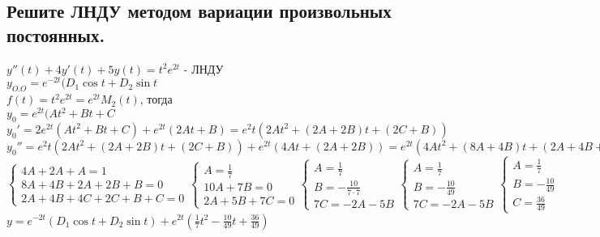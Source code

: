 \documentclass{article}
\begin{document}
    \subsection{Решите ЛНДУ методом вариации произвольных постоянных.}
    $y''(t) + 4y'(t) + 5y(t) = t^2e^{2t}$ - ЛНДУ\\
    $y_{O.O} = e^{-2t}(D_1 \cos t + D_2 \sin t$\\
    $f(t) = t^2 e^{2t} = e^{2t} M_2 (t)$, тогда\\
    $y_0 = e^{2t} (A t^2 + B t + C$\\
    $y_0' = 2e^{2t}(A t^2 + B t + C) + e^{2t}(2A t + B) = 
    e^2t(2A t^2 + (2A + 2B)t + (2C + B))$\\
    $y_0'' = e^2t(2A t^2 + (2A + 2B)t + (2C + B)) + e^{2t}(4A t + (2A + 2B)) = e^{2t}(4A t^2 + (8A + 4B)t + (2A + 4B + 4C))$\\
    \begin{equation*}
        \begin{cases}
            4A + 2A + A = 1\\
            8A + 4B + 2A + 2B + B = 0\\
            2A + 4B + 4C + 2C + B + C = 0
        \end{cases}
        \begin{cases}
            A = \frac{1}{7}\\
            10A + 7B = 0\\
            2A + 5B + 7C = 0
        \end{cases}
        \begin{cases}
            A = \frac{1}{7}\\
            B = - \frac{10}{7 \cdot 7} \\
            7C = -2A -5B
        \end{cases}
        \begin{cases}
            A = \frac{1}{7}\\
            B = - \frac{10}{49} \\
            7C = -2A -5B
        \end{cases}
        \begin{cases}
            A = \frac{1}{7}\\
            B = - \frac{10}{49} \\
            C = \frac{36}{49}
        \end{cases}
    \end{equation*}
    $y=e^{-2t}(D_1 \cos t + D_2 \sin t) + e^{2t}(\frac{1}{7}t^2 - \frac{10}{49}t + \frac{36}{49})$
    
\end{document}
